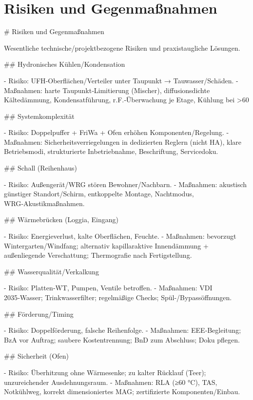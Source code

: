 \documentclass[11pt,oneside]{report}
\begin{document}
\chapter{Risiken und Gegenmaßnahmen}
\begin{markdown}
# Risiken und Gegenmaßnahmen

Wesentliche technische/projektbezogene Risiken und praxistaugliche Lösungen.

## Hydronisches Kühlen/Kondensation

- Risiko: UFH‑Oberflächen/Verteiler unter Taupunkt → Tauwasser/Schäden.
- Maßnahmen: harte Taupunkt‑Limitierung (Mischer), diffusionsdichte Kältedämmung, Kondensatführung, r.F.‑Überwachung je Etage, Kühlung bei >60 %

## Systemkomplexität

- Risiko: Doppelpuffer + FriWa + Ofen erhöhen Komponenten/Regelung.
- Maßnahmen: Sicherheitsverriegelungen in dedizierten Reglern (nicht HA), klare Betriebsmodi, strukturierte Inbetriebnahme, Beschriftung, Servicedoku.

## Schall (Reihenhaus)

- Risiko: Außengerät/WRG stören Bewohner/Nachbarn.
- Maßnahmen: akustisch günstiger Standort/Schirm, entkoppelte Montage, Nachtmodus, WRG‑Akustikmaßnahmen.

## Wärmebrücken (Loggia, Eingang)

- Risiko: Energieverlust, kalte Oberflächen, Feuchte.
- Maßnahmen: bevorzugt Wintergarten/Windfang; alternativ kapillaraktive Innendämmung + außenliegende Verschattung; Thermografie nach Fertigstellung.

## Wasserqualität/Verkalkung

- Risiko: Platten‑WT, Pumpen, Ventile betroffen.
- Maßnahmen: VDI 2035‑Wasser; Trinkwasserfilter; regelmäßige Checks; Spül-/Bypassöffnungen.

## Förderung/Timing

- Risiko: Doppelförderung, falsche Reihenfolge.
- Maßnahmen: EEE‑Begleitung; BzA vor Auftrag; saubere Kostentrennung; BnD zum Abschluss; Doku pflegen.

## Sicherheit (Ofen)

- Risiko: Überhitzung ohne Wärmesenke; zu kalter Rücklauf (Teer); unzureichender Ausdehnungsraum.
- Maßnahmen: RLA (≥60 °C), TAS, Notkühlweg, korrekt dimensioniertes MAG; zertifizierte Komponenten/Einbau.
\end{markdown}
\end{document}
